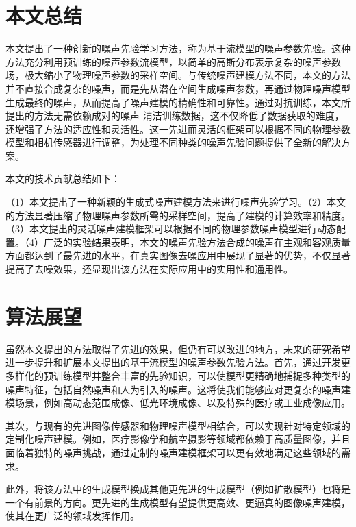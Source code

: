 \section{本文总结}

本文提出了一种创新的噪声先验学习方法，称为基于流模型的噪声参数先验。这种方法充分利用预训练的噪声参数流模型，以简单的高斯分布表示复杂的噪声参数场，极大缩小了物理噪声参数的采样空间。与传统噪声建模方法不同，本文的方法并不直接合成复杂的噪声，而是先从潜在空间生成噪声参数，再通过物理噪声模型生成最终的噪声，从而提高了噪声建模的精确性和可靠性。通过对抗训练，本文所提出的方法无需依赖成对的噪声-清洁训练数据，这不仅降低了数据获取的难度，还增强了方法的适应性和灵活性。这一先进而灵活的框架可以根据不同的物理参数模型和相机传感器进行调整，为处理不同种类的噪声先验问题提供了全新的解决方案。

本文的技术贡献总结如下：

（1）本文提出了一种新颖的生成式噪声建模方法来进行噪声先验学习。（2）本文的方法显著压缩了物理噪声参数所需的采样空间，提高了建模的计算效率和精度。（3）本文提出的灵活噪声建模框架可以根据不同的物理参数噪声模型进行动态配置。（4）广泛的实验结果表明，本文的噪声先验方法合成的噪声在主观和客观质量方面都达到了最先进的水平，在真实图像去噪应用中展现了显著的优势，不仅显著提高了去噪效果，还显现出该方法在实际应用中的实用性和通用性。

\section{算法展望}

虽然本文提出的方法取得了先进的效果，但仍有可以改进的地方，未来的研究希望进一步提升和扩展本文提出的基于流模型的噪声参数先验方法。首先，通过开发更多样化的预训练模型并整合丰富的先验知识，可以使模型更精确地捕捉多种类型的噪声特征，包括自然噪声和人为引入的噪声。这将使我们能够应对更复杂的噪声建模场景，例如高动态范围成像、低光环境成像、以及特殊的医疗或工业成像应用。

其次，与现有的先进图像传感器和物理噪声模型相结合，可以实现针对特定领域的定制化噪声建模。例如，医疗影像学和航空摄影等领域都依赖于高质量图像，并且面临着独特的噪声挑战，通过定制的噪声建模框架可以更有效地满足这些领域的需求。

此外，将该方法中的生成模型换成其他更先进的生成模型（例如扩散模型）也将是一个有前景的方向。更先进的生成模型有望提供更高效、更逼真的图像噪声建模，使其在更广泛的领域发挥作用。

